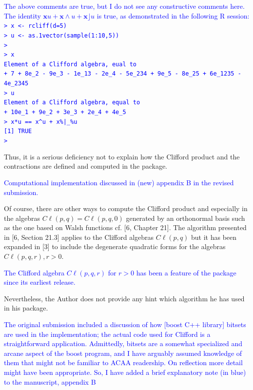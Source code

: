 \documentclass{article}
\newcommand{\cliff}[1]{\ensuremath{C\ell\left(#1\right)}}
\begin{document}
\begin{itemize}
\textcolor{blue}{The above comments are true, but I do not see any
  constructive comments here.  The identity $\mathbf{x}u +
  \mathbf{x}\wedge u+\mathbf{x}\rfloor u$ is true, as demonstrated
  in the following R session:\\[20pt]
{\tt > x <- rcliff(d=5)}\\
{\tt > u <- as.1vector(sample(1:10,5))}\\
{\tt > }\\
{\tt > x}\\
{\tt Element of a Clifford algebra, eual to}\\
{\tt + 7 + 8e\_2 - 9e\_3 - 1e\_13 - 2e\_4 - 5e\_234 + 9e\_5 - 8e\_25 + 6e\_1235 - 4e\_2345}\\
{\tt > u}\\
{\tt Element of a Clifford algebra, equal to}\\
{\tt + 10e\_1 + 9e\_2 + 3e\_3 + 2e\_4 + 4e\_5}\\
{\tt > x*u == x\string^u + x\%|\_\%u}\\
{\tt [1] TRUE}\\
{\tt > }\\
}

Thus, it is a
serious deficiency not to explain how the Clifford product and the
contractions are defined and computed in the package.

\textcolor{blue}{Computational implementation discussed in (new)
  appendix B in the revised submission.}

Of course,
there are other ways to compute the Clifford product and especially in
the algebras $\cliff{p, q} = \cliff{p, q, 0}$ generated by an
orthonormal basis such as the one based on Walsh functions cf. [6,
  Chapter 21]. The algorithm presented in [6, Section 21.3] applies to
the Clifford algebras \cliff{p, q} but it has been expanded in [3] to
include the degenerate quadratic forms for the algebras $\cliff{p, q,
  r}, r > 0$.

\textcolor{blue}{The Clifford algebra \cliff{p,q,r} for $r>0$ has been
  a feature of the package since its earliest release.}

Nevertheless, the Author does not provide any hint
which algorithm he has used in his package.

\textcolor{blue}{The original submission included a discussion of how
  [boost C++ library] bitsets are used in the implementation; the
  actual code used for Clifford is a straightforward application.
  Admittedly, bitsets are a somewhat specialized and arcane aspect of
  the boost program, and I have arguably assumed knowledge of them
  that might not be familiar to ACAA readership.  On reflection more
  detail might have been appropriate.  So, I have added a brief
  explanatory note (in \textcolor{blue}{blue}) to the manuscript,
  appendix B}


\end{itemize}
\end{document}
